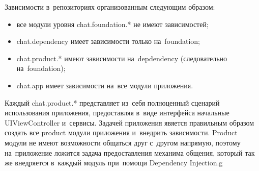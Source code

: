 Зависимости в~репозиториях организованным следующим образом: 

\begin{itemize}
\item все модули уровня chat.foundation.* не имеют зависимостей;
\item chat.dependency имеет зависимости только на~foundation;
\item chat.product.* имеют зависимости на~depdendency (следовательно на~foundation);
\item chat.app имеет зависимости на~все модули приложения.
\end{itemize}

Каждый chat.product.* представляет из~себя полноценный сценарий использования приложения, предоставляя в~виде интерфейса начальные UIViewController и~сервисы. Задачей приложения явяется правильным образом создать все product модули приложения и~внедрить зависимости. Product модули не имеют возможности общаться друг с~другом напрямую, поэтому на~приложение ложится задача предоставления механима общения, который так же внедряется в~каждый модуль при~помощи Dependency Injection.g